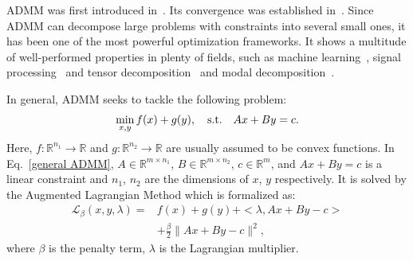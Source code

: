 \documentclass[twoside]{article}
\begin{document}
\begin{multicols}{2}
ADMM was first introduced in~\cite{gabay1976dual}.
Its convergence was established in~\cite{gabay1983augmented,glowinski1989augmented}.
Since ADMM can decompose large problems with constraints into several small ones, it has been one of the most powerful optimization frameworks. It shows a multitude of well-performed properties in plenty of fields, such as machine learning~\cite{boyd2011distributed}, signal processing~\cite{sun2018iteratively} and tensor decomposition~\cite{goldfarb2014robust} and modal decomposition~\cite{masuyama2018modal}.

In general, ADMM seeks to tackle the following problem:
\begin{equation}\label{general ADMM}
\min\limits_{x,y} f(x) + g(y),     \quad {\rm s.t.} \quad Ax+By = c.
\end{equation}
Here, $f: \mathbb{R}^{n_1} \rightarrow \mathbb{R} $ and $g: \mathbb{R}^{n_2} \rightarrow \mathbb{R}$ are usually assumed to be convex functions.
In Eq.~\eqref{general ADMM}, $A \in \mathbb{R}^{m \times n_1}$, $B \in \mathbb{R}^{m \times n_2}$, $c \in \mathbb{R}^m$, and $Ax+By = c$ is a linear constraint and $n_1$, $n_2$ are the dimensions of $x$, $y$ respectively.
It is solved by the Augmented Lagrangian Method which is formalized as: 
\begin{equation}\label{equ:into}
\begin{aligned}
    \mathcal{L}_\beta(x, y, \lambda) = & f(x) + g(y) + <\lambda, Ax+By-c>     \\
                                     & + \frac{\beta}{2}\|Ax+By-c\|^2,
\end{aligned}
\end{equation}
where $\beta$ is the penalty term, $\lambda$ is the Lagrangian multiplier.


\end{multicols}
\end{document}
